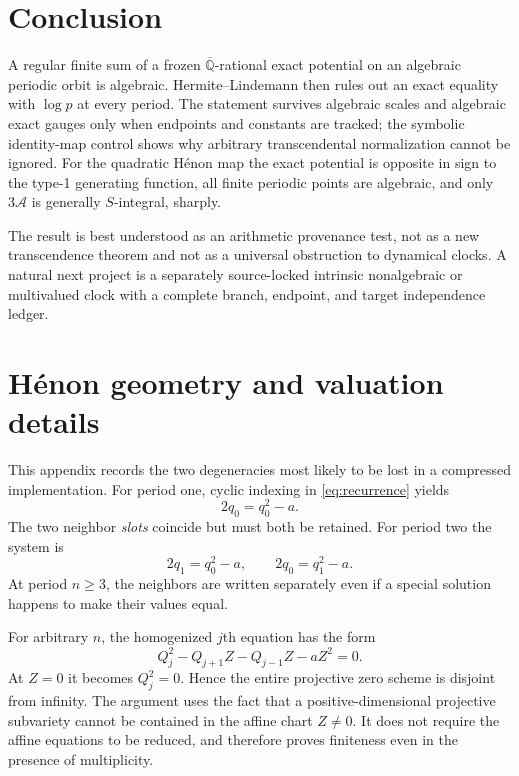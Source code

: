\documentclass[11pt]{article}
\theoremstyle{definition}
\theoremstyle{remark}
\newcommand{\Qbar}{\overline{\mathbb Q}}
\newcommand{\Action}{\mathcal A}
\begin{document}
\section{Conclusion}
\label{sec:conclusion}

A regular finite sum of a frozen $\Qbar$-rational exact potential on an
algebraic periodic orbit is algebraic.  Hermite--Lindemann then rules out an
exact equality with $\log p$ at every period.  The statement survives
algebraic scales and algebraic exact gauges only when endpoints and constants
are tracked; the symbolic identity-map control shows why arbitrary
transcendental normalization cannot be ignored.  For the quadratic H\'enon
map the exact potential is opposite in sign to the type-1 generating function,
all finite periodic points are algebraic, and only $3\Action$ is generally
$S$-integral, sharply.

The result is best understood as an arithmetic provenance test, not as a new
transcendence theorem and not as a universal obstruction to dynamical clocks.
A natural next project is a separately source-locked intrinsic
nonalgebraic or multivalued clock with a complete branch, endpoint, and target
independence ledger.

\label{page:conclusion-end}



\appendix

\section{H\'enon geometry and valuation details}
\label{app:henon-details}

This appendix records the two degeneracies most likely to be lost in a
compressed implementation.  For period one, cyclic indexing in
\eqref{eq:recurrence} yields
\begin{equation}
  2q_0=q_0^2-a.
\end{equation}
The two neighbor \emph{slots} coincide but must both be retained.  For period
two the system is
\begin{equation}
  2q_1=q_0^2-a,
  \qquad
  2q_0=q_1^2-a.
\end{equation}
At period $n\ge3$, the neighbors are written separately even if a special
solution happens to make their values equal.

For arbitrary $n$, the homogenized $j$th equation has the form
\begin{equation}
  Q_j^2-Q_{j+1}Z-Q_{j-1}Z-aZ^2=0.
\end{equation}
At $Z=0$ it becomes $Q_j^2=0$.  Hence the entire projective zero scheme is
disjoint from infinity.  The argument uses the fact that a
positive-dimensional projective subvariety cannot be contained in the affine
chart $Z\ne0$.  It does not require the affine equations to be reduced, and
therefore proves finiteness even in the presence of multiplicity.
\end{document}
